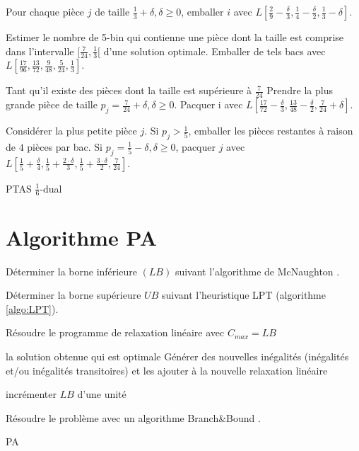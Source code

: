 \documentclass[a4paper,12pt]{report}
\theoremstyle{plain}				%
\theoremstyle{definition}				%
\begin{document}
\begin{appendices}
\begin{algorithm}[H]
Pour chaque pièce $j$ de taille $\frac{1}{3}+\delta, \delta \geq 0$,
emballer $i$
avec $L[\frac{2}{9}-\frac{\delta}{3},
        \frac{1}{4}-\frac{\delta}{2},
        \frac{1}{3}-\delta]$.

\BlankLine %
Estimer le nombre de 5-bin qui contienne une pièce
dont la taille est comprise dans l'intervalle
$[\frac{7}{24},\frac{1}{3}[$ d'une solution optimale.
Emballer de tels bacs avec
$L[\frac{17}{96},
   \frac{13}{72},
   \frac{9}{48},
   \frac{5}{24},
   \frac{1}{3}]$.

Tant qu'il existe des pièces dont la taille est supérieure à $\frac{7}{24}$
Prendre la plus grande pièce de taille $p_j = \frac{7}{24}+\delta, \delta \geq 0$.
Pacquer i avec
$L[\frac{17}{72}-\frac{\delta}{3},
   \frac{13}{48}-\frac{\delta}{2},
   \frac{7}{24}+\delta]$.

Considérer la plus petite pièce $j$.
Si $p_j>\frac{1}{5}$, emballer les pièces restantes à raison de $4$ pièces par bac.
Si $p_j=\frac{1}{5}-\delta, \delta \geq 0$, pacquer $j$ avec
$L[\frac{1}{5}+\frac{\delta}{4},
   \frac{1}{5}+\frac{2 \cdot \delta}{3},
   \frac{1}{5}+\frac{3 \cdot \delta}{2},
   \frac{7}{24}]$.

\BlankLine %



\caption{PTAS $\frac{1}{6}$-dual}
\label{algo:PTASDual1_6}
\end{algorithm}


\section*{Algorithme PA}
\label{ap:PA}

\begin{algorithm}[H]
\DontPrintSemicolon

Déterminer la borne inférieure $(LB)$ suivant l'algorithme de
McNaughton \cite{mcnaughton1959scheduling}.\;

Déterminer la borne supérieure $UB$ suivant l'heuristique LPT
(algorithme \ref{algo:LPT}).\;


{
	Résoudre le programme de relaxation linéaire avec $C_{max} = LB$
	
	{
	
		{
		\Return la solution obtenue qui est optimale
		}
		\Sinon
		{
		Générer des nouvelles inégalités 
		(inégalités et/ou inégalités transitoires) et les ajouter à la 
		nouvelle relaxation linéaire
		}
	}
	\Sinon
	{
	incrémenter $LB$ d'une unité
	}	


}
\Return Résoudre le problème avec un algorithme Branch\&Bound
.\;
\caption{PA\label{algo:PA}}
\end{algorithm}




\end{appendices} 
\end{document}
